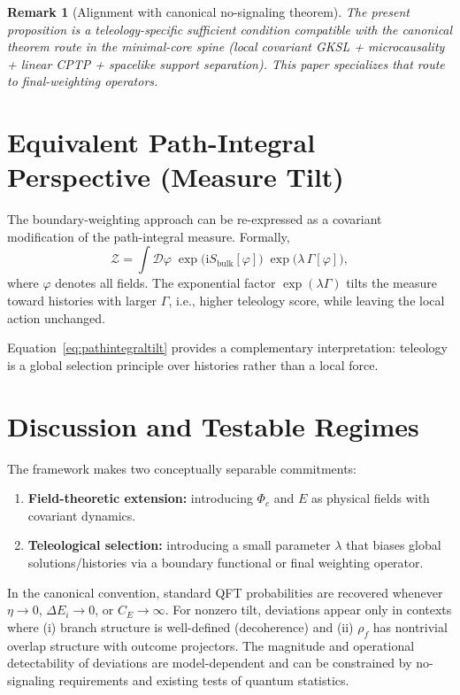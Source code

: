 \documentclass[reprint,amsmath,amssymb,aps,showkeys]{revtex4-2}
\newtheorem{remark}{Remark}
\newcommand{\ii}{\mathrm{i}}
\newcommand{\cZ}{\mathcal{Z}}
\begin{document}
\begin{remark}[Alignment with canonical no-signaling theorem]
The present proposition is a teleology-specific sufficient condition compatible with the canonical theorem route in the minimal-core spine (local covariant GKSL + microcausality + linear CPTP + spacelike support separation). This paper specializes that route to final-weighting operators.
\end{remark}

\section{Equivalent Path-Integral Perspective (Measure Tilt)}
The boundary-weighting approach can be re-expressed as a covariant modification of the path-integral measure. Formally,
\begin{equation}
\cZ = \int \mathcal{D}\varphi\; \exp\big(\ii S_{\text{bulk}}[\varphi]\big)\;\exp\big(\lambda\,\Gamma[\varphi]\big),
\label{eq:pathintegraltilt}
\end{equation}
where $\varphi$ denotes all fields. The exponential factor $\exp(\lambda\Gamma)$ tilts the measure toward histories with larger $\Gamma$, i.e., higher teleology score, while leaving the local action unchanged.

Equation~\eqref{eq:pathintegraltilt} provides a complementary interpretation: teleology is a global selection principle over histories rather than a local force.

\section{Discussion and Testable Regimes}
The framework makes two conceptually separable commitments:
\begin{enumerate}
\item \textbf{Field-theoretic extension:} introducing $\Phi_c$ and $E$ as physical fields with covariant dynamics.
\item \textbf{Teleological selection:} introducing a small parameter $\lambda$ that biases global solutions/histories via a boundary functional or final weighting operator.
\end{enumerate}

In the canonical convention, standard QFT probabilities are recovered whenever $\eta\to 0$, $\Delta E_i\to 0$, or $C_E\to\infty$. For nonzero tilt, deviations appear only in contexts where (i) branch structure is well-defined (decoherence) and (ii) $\rho_f$ has nontrivial overlap structure with outcome projectors. The magnitude and operational detectability of deviations are model-dependent and can be constrained by no-signaling requirements and existing tests of quantum statistics.
\end{document}
